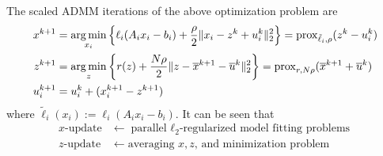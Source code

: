 The scaled ADMM iterations of the above optimization problem are
\begin{align*}
    x^{k+1} & = \operatorname*{arg\,min}_{x_i} \left\{ \ell_i(A_ix_i-b_i) + \dfrac{\rho}{2} \lVert x_i - z^k + u_i^k \rVert_2^2 \right\} = \operatorname{prox}_{\tilde{\ell}_i,\rho}(z^k - u_i^k) \\
    z^{k+1} & = \operatorname*{arg\,min}_z \left\{ r(z) + \dfrac{N\rho}{2} \lVert z - \overline{x}^{k+1} - \overline{u}^k \rVert_2^2 \right\} = \operatorname{prox}_{r,N\rho}(\overline{x}^{k+1} + \overline{u}^k) \\
    u_i^{k+1} & = u_i^k + (x_i^{k+1} - z^{k+1})
\end{align*}
where $\tilde{\ell}_i(x_i) := \ell_i(A_ix_i-b_i)$. It can be seen that
\begin{align*}
    \text{$x$-update} & \leftarrow \text{parallel $\ell_2$-regularized model fitting problems} \\
    \text{$z$-update} & \leftarrow \text{averaging $x,z$, and minimization problem} \\
\end{align*}

